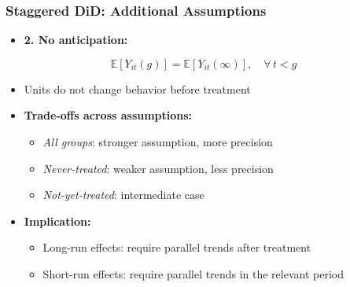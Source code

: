 \documentclass[12pt, compress]{beamer}
\begin{document}
\begin{frame}
	\frametitle{Staggered DiD: Additional Assumptions}

\begin{itemize}
	\item \textbf{2. No anticipation:}
\end{itemize}

\begin{equation*}
\mathbb{E}[Y_{it}(g)] = \mathbb{E}[Y_{it}(\infty)], 
\quad \forall\, t < g
\end{equation*}

\begin{itemize}
	\item Units do not change behavior before treatment
	
	\medskip
	
	\item \textbf{Trade-offs across assumptions:}
	\begin{itemize}
		\item \textit{All groups}: stronger assumption, more precision
		\item \textit{Never-treated}: weaker assumption, less precision
		\item \textit{Not-yet-treated}: intermediate case
	\end{itemize}
	
	\medskip
	
	\item \textbf{Implication:}
	\begin{itemize}
		\item Long-run effects: require parallel trends after treatment
		\item Short-run effects: require parallel trends in the relevant period
	\end{itemize}
\end{itemize}

\end{frame}
\end{document}
